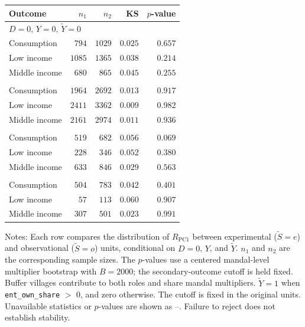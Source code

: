 \begin{threeparttable}
\begin{tabular}{lrrrr}
\toprule
Outcome & $n_1$ & $n_2$ & KS & $p$-value \\
\midrule
\multicolumn{5}{l}{$D=0,\,Y=0,\,\widetilde{Y}=0$}\\
\quad Consumption & $794$ & $1029$ & $0.025$ & $0.657$ \\
\quad Low income & $1085$ & $1365$ & $0.038$ & $0.214$ \\
\quad Middle income & $680$ & $865$ & $0.045$ & $0.255$ \\
\addlinespace[0.6em]
\multicolumn{5}{l}{$D=0,\,Y=0,\,\widetilde{Y}=1$}\\
\quad Consumption & $1964$ & $2692$ & $0.013$ & $0.917$ \\
\quad Low income & $2411$ & $3362$ & $0.009$ & $0.982$ \\
\quad Middle income & $2161$ & $2974$ & $0.011$ & $0.936$ \\
\addlinespace[0.6em]
\multicolumn{5}{l}{$D=0,\,Y=1,\,\widetilde{Y}=0$}\\
\quad Consumption & $519$ & $682$ & $0.056$ & $0.069$ \\
\quad Low income & $228$ & $346$ & $0.052$ & $0.380$ \\
\quad Middle income & $633$ & $846$ & $0.029$ & $0.563$ \\
\addlinespace[0.6em]
\multicolumn{5}{l}{$D=0,\,Y=1,\,\widetilde{Y}=1$}\\
\quad Consumption & $504$ & $783$ & $0.042$ & $0.401$ \\
\quad Low income & $57$ & $113$ & $0.060$ & $0.907$ \\
\quad Middle income & $307$ & $501$ & $0.023$ & $0.991$ \\
\bottomrule
\end{tabular}
\begin{tablenotes}[flushleft]
\small
\item Notes: Each row compares the distribution of $R_{\mathrm{PC1}}$ between experimental ($\widetilde{S}=e$) and observational ($\widetilde{S}=o$) units, conditional on $D=0$, $Y$, and $\widetilde{Y}$. $n_1$ and $n_2$ are the corresponding sample sizes. The $p$-values use a centered mandal-level multiplier bootstrap with $B=2000$; the secondary-outcome cutoff is held fixed. Buffer villages contribute to both roles and share mandal multipliers. $\widetilde{Y}=1$ when \texttt{ent\_own\_share} $>$ 0, and zero otherwise. The cutoff is fixed in the original units. Unavailable statistics or $p$-values are shown as --. Failure to reject does not establish stability.
\end{tablenotes}
\end{threeparttable}
